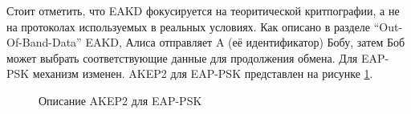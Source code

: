 Стоит отметить, что EAKD фокусируется на теоритической критпографии, а не на протоколах используемых в реальных условиях. Как описано в разделе ``Out-Of-Band-Data'' EAKD, Алиса отправляет A (её идентификатор) Бобу, затем Боб может выбрать соответствующие данные для продолжения обмена. Для EAP-PSK механизм изменен. AKEP2 для EAP-PSK представлен на рисунке \ref{img:eap-akep2}.

\begin{figure}[h!]
\caption{Описание AKEP2 для EAP-PSK}
\label{img:eap-akep2}
\end{figure}
